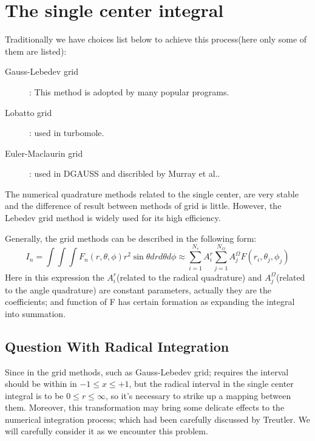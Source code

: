 \section{The single center integral}
%
%
%
Traditionally we have choices list below to achieve this process(here
only some of them are listed):
\begin{description}
  \item[Gauss-Lebedev grid]: This method is adopted by many popular
  programs.
  \item[Lobatto grid]: used in turbomole.
  \item[Euler-Maclaurin grid]: used in DGAUSS and discribled by
  Murray et al.\cite{MHL}.
\end{description}

The numerical quadrature methods related to the single center, are
very stable and the difference of result between methods of grid is
little. However, the Lebedev grid method is widely used for its high
efficiency.

Generally, the grid methods can be described in the following form:
\begin{equation}\label{}
I_{n} = \int\int\int F_{n}(r,\theta,\phi)r^{2}\sin\theta dr
d\theta d \phi \approx \sum^{N_{r}}_{i=1} A^{r}_{i}
\sum^{N_{\Omega}}_{j=1}A^{\Omega}_{j} F(r_{i}, \theta_{j}, \phi_{j})
\end{equation}
Here in this expression the $A^{r}_{i}$(related to the radical
quadrature) and $A^{\Omega}_{j}$(related to the angle quadrature)
are constant parameters, actually they are the coefficients; and
function of F has certain formation as expanding the integral into
summation.

\subsection{Question With Radical Integration}
Since in the grid methods, such as Gauss-Lebedev grid; requires the
interval should be within in $-1 \leq x \leq +1$, but the radical
interval in the single center integral is to be $0 \leq r \leq
\infty$, so it's necessary to strike up a mapping between them.
Moreover, this transformation may bring some delicate effects to the
numerical integration process; which had been carefully discussed by
Treutler\cite{OR}. We will carefully consider it as we encounter
this problem.

